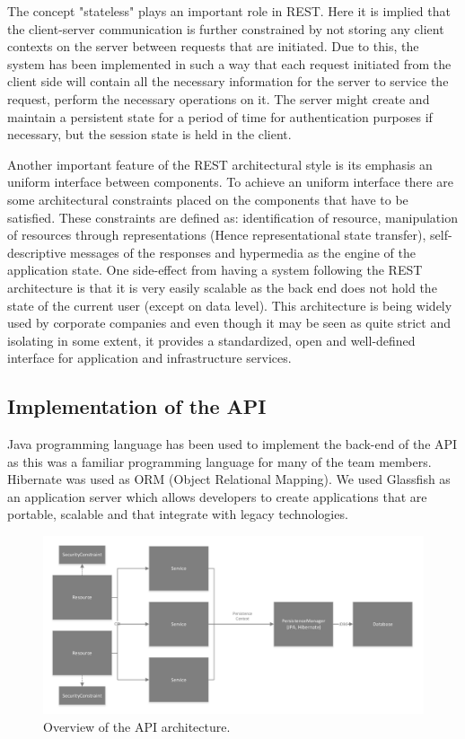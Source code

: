 The concept "stateless" plays an important role in REST. Here it is implied that the client-server communication is further constrained by not storing any client contexts on the server between requests that are initiated. Due to this, the system has been implemented in such a way that each request initiated from the client side will contain all the necessary information for the server to service the request, perform the necessary operations on it. The server might create and maintain a persistent state for a period of time for authentication purposes if necessary, but the session state is held in the client. 

Another important feature of the REST architectural style is its emphasis an uniform interface between components. To achieve an uniform interface there are some architectural constraints placed on the components that have to be satisfied. These constraints are defined as: identification of resource, manipulation of resources through representations (Hence representational state transfer), self-descriptive messages of the responses and hypermedia as the engine of the application state. One side-effect from having a system following the REST architecture is that it is very easily scalable as the back end does not hold the state of the current user (except on data level). This architecture is being widely used by corporate companies and even though it may be seen as quite strict and isolating in some extent, it provides a standardized, open and well-defined interface for application and infrastructure services.

\subsection{Implementation of the API}
Java programming language has been used to implement the back-end of the API as this was a familiar programming language for many of the team members. Hibernate was used as ORM (Object Relational Mapping). We used Glassfish as an application server which allows developers to create applications that are portable, scalable and that integrate with legacy technologies. 

\begin{figure}[h]
  \centering
  \includegraphics[width=\linewidth]{figures/API_architecture.pdf}
  \caption[API architecture.]{Overview of the API architecture.}
  \label{fig:apiArchitecture}
\end{figure}

